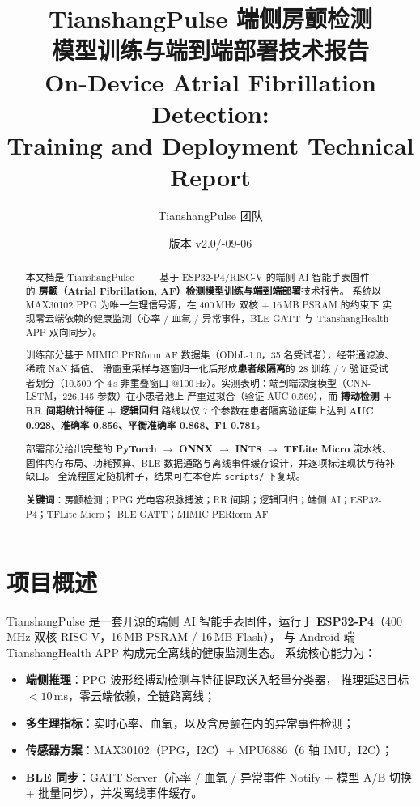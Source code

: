 \documentclass[11pt,a4paper]{ctexart}
\title{\bfseries TianshangPulse 端侧房颤检测\\[4pt]
       模型训练与端到端部署技术报告\\[6pt]
       \large On-Device Atrial Fibrillation Detection:\\ Training and Deployment Technical Report}
\author{TianshangPulse 团队}
\date{版本 v2.0\quad/\quad 2026-09-06}
\newcommand{\feat}[1]{\texttt{#1}}
\begin{document}
\maketitle
\vspace{-1em}

\begin{abstract}
\noindent
本文档是 TianshangPulse —— 基于 ESP32-P4/RISC-V 的端侧 AI 智能手表固件 —— 的
\textbf{房颤（Atrial Fibrillation, AF）检测模型训练与端到端部署}技术报告。
系统以 MAX30102 PPG 为唯一生理信号源，在 400\,MHz 双核 + 16\,MB PSRAM 的约束下
实现零云端依赖的健康监测（心率 / 血氧 / 异常事件，BLE GATT 与 TianshangHealth APP 双向同步）。

训练部分基于 MIMIC PERform AF 数据集（ODbL-1.0，35 名受试者），经带通滤波、稀疏 NaN 插值、
滑窗重采样与逐窗归一化后形成\textbf{患者级隔离}的 28 训练 / 7 验证受试者划分（10{,}500 个
4\,s 非重叠窗口 @100\,Hz）。实测表明：端到端深度模型（CNN-LSTM，226{,}145 参数）在小患者池上
严重过拟合（验证 AUC 0.569），而 \textbf{搏动检测 + RR 间期统计特征 + 逻辑回归} 路线以仅
7 个参数在患者隔离验证集上达到 \textbf{AUC 0.928、准确率 0.856、平衡准确率 0.868、F1 0.781}。

部署部分给出完整的 \textbf{PyTorch $\rightarrow$ ONNX $\rightarrow$ INT8 $\rightarrow$ TFLite Micro}
流水线、固件内存布局、功耗预算、BLE 数据通路与离线事件缓存设计，并逐项标注现状与待补缺口。
全流程固定随机种子，结果可在本仓库 \feat{scripts/} 下复现。

\vspace{0.8em}
\textbf{关键词}：房颤检测；PPG 光电容积脉搏波；RR 间期；逻辑回归；端侧 AI；ESP32-P4；TFLite Micro；
BLE GATT；MIMIC PERform AF
\end{abstract}

\tableofcontents
\newpage

\section{项目概述}
\label{sec:overview}

TianshangPulse 是一套开源的端侧 AI 智能手表固件，运行于
\textbf{ESP32-P4}（400\,MHz 双核 RISC-V，16\,MB PSRAM / 16\,MB Flash），
与 Android 端 TianshangHealth APP 构成完全离线的健康监测生态。
系统核心能力为：

\begin{itemize}
  \item \textbf{端侧推理}：PPG 波形经搏动检测与特征提取送入轻量分类器，
        推理延迟目标 $<10\,\mathrm{ms}$，零云端依赖，全链路离线；
  \item \textbf{多生理指标}：实时心率、血氧，以及含房颤在内的异常事件检测；
  \item \textbf{传感器方案}：MAX30102（PPG，I2C）+ MPU6886（6 轴 IMU，I2C）；
  \item \textbf{BLE 同步}：GATT Server（心率 / 血氧 / 异常事件 Notify +
        模型 A/B 切换 + 批量同步），并发离线事件缓存。
\end{itemize}
\end{document}
